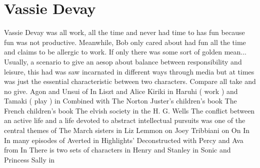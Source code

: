 \documentclass[12pt]{book}
\begin{document}
\chapter{Vassie Devay}

Vassie Devay was all work, all the time and never had time to has fun because fun was not productive. Meanwhile, Bob only cared about had fun all the time and claims to be allergic to work. If only there was some sort of golden mean... Usually, a scenario to give an aesop about balance between responsibility and leisure, this had was saw incarnated in different ways through media but at times was just the essential characteristic between two characters. Compare all take and no give. Agon and Unsui of In Liszt and Alice Kiriki in Haruhi ( work ) and Tamaki ( play ) in Combined with The Norton Juster's children's book The French children's book The elvish society in the H. G. Wells The conflict between an active life and a life devoted to abstract intellectual pursuits was one of the central themes of The March sisters in Liz Lemmon on Joey Tribbiani on On In In many episodes of Averted in Highlights' Deconstructed with Percy and Ava from In There is two sets of characters in Henry and Stanley in Sonic and Princess Sally in
\end{document}
